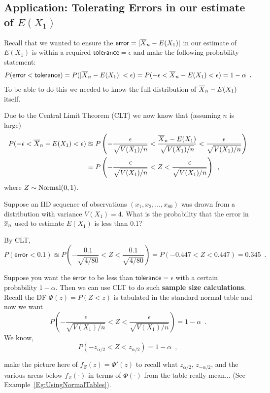 \subsection{Application: Tolerating Errors in our estimate of $E(X_1)$}
Recall that we wanted to ensure the $\mathsf{error}=|\overline{X}_n - E(X_1)|$ in our estimate of $E(X_1)$ is within a required $\mathsf{tolerance}=\epsilon$ and make the following probability statement: 
\[
P( \mathsf{error} < \mathsf{tolerance}) = P( |\overline{X}_n - E(X_1)| < \epsilon ) = P(-\epsilon < \overline{X}_n - E(X_1) < \epsilon) = 1-\alpha \enspace .
\]
To be able to do this we needed to know the full distribution of $\overline{X}_n - E(X_1)$ itself.  

Due to the Central Limit Theorem (CLT) we now know that (assuming $n$ is large)
\begin{align*}
P(-\epsilon < \overline{X}_n - E(X_1) < \epsilon) 
&\approxeq P\left(-\frac{\epsilon}{\sqrt{V(X_1)/n}} < \frac{\overline{X}_n - E(X_1)}{\sqrt{V(X_1)/n}} < \frac{\epsilon}{\sqrt{V(X_1)/n}}\right)\\
&= P\left(-\frac{\epsilon}{\sqrt{V(X_1)/n}} < Z < \frac{\epsilon}{\sqrt{V(X_1)/n}} \right) \enspace ,
\end{align*}
where $Z \sim \mbox{{\rm Normal}}(0,1)$.

\begin{example}\label{EgProbOfErrorInMeanEstimateFromKnownVar}
Suppose an IID sequence of observations $(x_1,x_2,\ldots,x_{80})$ was drawn from a distribution with variance $V(X_1)=4$.  
What is the probability that the error in $\overline{x}_n$ used to estimate $E(X_1)$ is less than $0.1$?

By CLT,
\[
P (\mathsf{error} < 0.1) \approxeq P \left( -\frac{0.1}{\sqrt{4/80}} < Z < \frac{0.1}{\sqrt{4/80}} \right) 
= P(-0.447 < Z < 0.447)= 0.345 \enspace .
\] 
\end{example}

Suppose you want the $\mathsf{error}$ to be less than $\mathsf{tolerance}=\epsilon$ with a certain probability $1-\alpha$.  
Then we can use CLT to do such {\bf sample size calculations}.
Recall the DF $\Phi(z) = P(Z < z)$ is tabulated in the standard normal table and now we want
\[
P \left(-\frac{\epsilon}{\sqrt{V(X_1)/n}} < Z < \frac{\epsilon}{\sqrt{V(X_1)/n}} \right) = 1 -\alpha \enspace .
\]
We know,
\[
P \left(-z_{\alpha/2} < Z < z_{\alpha/2} \right) = 1 -\alpha \enspace ,
\]

\vspace{1.5cm}

{\tiny make the picture here of $f_Z(z) = \Phi'(z)$ to recall what $z_{\alpha/2}$, $z_{-\alpha/2}$, and the various areas below $f_Z(\cdot)$ in terms of $\Phi(\cdot)$ from the table really mean... (See Example~\ref{Eg:UsingNormalTables}).}

